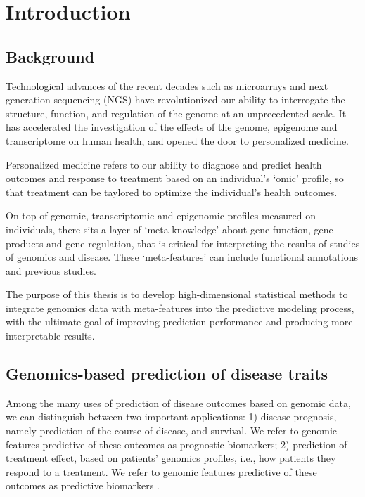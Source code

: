 \chapter{Introduction}
\label{cha:introduction}

\section{Background}
\label{sec:Background}
Technological advances of the recent decades such as microarrays and next generation sequencing (NGS) have revolutionized our ability to interrogate the structure, function, and regulation of the genome at an unprecedented scale. It has accelerated the investigation of the effects of the genome, epigenome and transcriptome on human health, and opened the door to personalized medicine. 

Personalized medicine refers to our ability to diagnose and predict health outcomes and response to treatment based on an individual's `omic' profile, so that treatment can be taylored to optimize the individual's health outcomes. 

On top of genomic, transcriptomic and epigenomic  profiles measured on individuals, there sits a layer of `meta knowledge' about gene function, gene products and gene regulation, that is critical for interpreting the results of studies of genomics and disease. These `meta-features' can include functional annotations and previous studies. 

The purpose of this thesis is to develop high-dimensional statistical methods to integrate  genomics data with meta-features into the predictive modeling process, with the ultimate goal of improving  prediction performance and producing more interpretable results.

\section{Genomics-based prediction of disease traits}
\label{sec:Prediction}
Among the many uses of prediction of disease outcomes based on genomic data, we can distinguish between two important applications: 1) disease prognosis, namely prediction of the course of disease, and survival. We refer to genomic features predictive of these outcomes as prognostic biomarkers; 2) prediction of treatment effect, based on patients' genomics profiles, i.e., how patients they respond to a treatment. We refer to genomic features predictive of these outcomes as predictive biomarkers \citep{mandrekar2010predictive}. 


